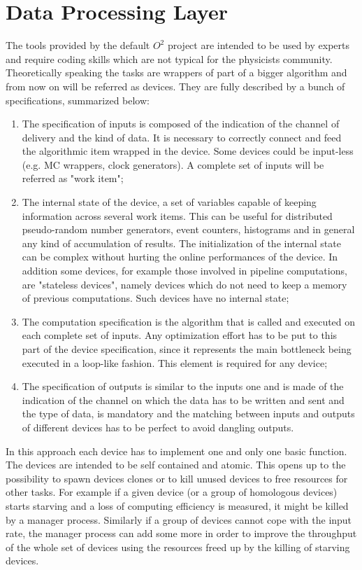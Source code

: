 \section{Data Processing Layer}
The tools provided by the default $O^2$ project are intended to be used by experts and require coding skills which are not typical for the physicists community.
Theoretically speaking the tasks are wrappers of part of a bigger algorithm and from now on will be referred as devices.
They are fully described by a bunch of specifications, summarized below:
\begin{enumerate}
    \item The specification of inputs is composed of the indication of the channel of delivery and the kind of data. It is necessary to correctly connect and feed the algorithmic item wrapped in the device. Some devices could be input-less (e.g. MC wrappers, clock generators). A complete set of inputs will be referred as "work item";
    \item The internal state of the device, a set of variables capable of keeping information across several work items. This can be useful for distributed pseudo-random number generators, event counters, histograms and in general any kind of accumulation of results. The initialization of the internal state can be complex without hurting the online performances of the device. In addition some devices, for example those involved in pipeline computations, are "stateless devices", namely devices which do not need to keep a memory of previous computations. Such devices have no internal state;
    \item The computation specification is the algorithm that is called and executed on each complete set of inputs. Any optimization effort has to be put to this part of the device specification, since it represents the main bottleneck being executed in a loop-like fashion. This element is required for any device;
    \item The specification of outputs is similar to the inputs one and is made of the indication of the channel on which the data has to be written and sent and the type of data, is mandatory and the matching between inputs and outputs of different devices has to be perfect to avoid dangling outputs.
\end{enumerate}

In this approach each device has to implement one and only one basic function.
The devices are intended to be self contained and atomic.
This opens up to the possibility to spawn devices clones or to kill unused devices to free resources for other tasks.
For example if a given device (or a group of homologous devices) starts starving and a loss of computing efficiency is measured, it might be killed by a manager process.
Similarly if a group of devices cannot cope with the input rate, the manager process can add some more in order to improve the throughput of the whole set of devices using the resources freed up by the killing of starving devices.

